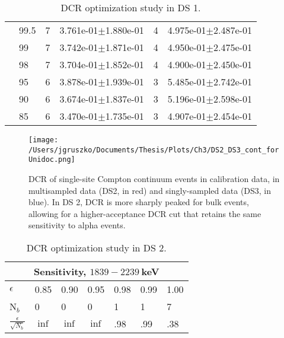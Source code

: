 \begin{table}[h]
\begin{tabular}{l l l l l l}
            &    99.5 &                      7 &            3.761e-01$\pm$1.880e-01 &                    4 &            4.975e-01$\pm$2.487e-01 \\
            &      99 &                      7 &            3.742e-01$\pm$1.871e-01 &                    4 &            4.950e-01$\pm$2.475e-01 \\
            &      98 &                      7 &            3.704e-01$\pm$1.852e-01 &                    4 &            4.900e-01$\pm$2.450e-01 \\
            &      95 &                      6 &            3.878e-01$\pm$1.939e-01 &                    3 &            5.485e-01$\pm$2.742e-01 \\
            &      90 &                      6 &            3.674e-01$\pm$1.837e-01 &                    3 &            5.196e-01$\pm$2.598e-01 \\
            &      85 &                      6 &            3.470e-01$\pm$1.735e-01 &                    3 &            4.907e-01$\pm$2.454e-01 \\


\end{tabular}
 \caption{DCR optimization study in DS 1.} 
 \label{tab:DCR_opt}
\end{table}


\begin{figure}[h]
 \centering
 \texttt{[image: /Users/jgruszko/Documents/Thesis/Plots/Ch3/DS2\_DS3\_cont\_forUnidoc.png]}
 \caption[Comparison of DCR in singly-sampled and multi-sampled MJD data sets]{DCR of single-site Compton continuum events in calibration data, in multisampled data (DS2, in red) and singly-sampled data (DS3, in blue). In DS 2, DCR is more sharply peaked for bulk events, allowing for a higher-acceptance DCR cut that retains the same sensitivity to alpha events.} 
 \label{fig:DS2_DS3_comparison}
\end{figure}

\begin{table}[h]
\centering
\begin{tabular}{l | l l l l l l}
\hline
\multicolumn{7}{c}{Sensitivity, $1839 - 2239~$keV} \\
\hline
$\epsilon$ & 0.85 & 0.90 & 0.95 & 0.98 & 0.99 & 1.00 \\
N$_{b}$ & 0 & 0 & 0 & 1 & 1 & 7\\
$\frac{\epsilon}{\sqrt{N_b}}$ & $\inf$ & $\inf$ & $\inf$ & .98 & .99 & .38\\
\end{tabular}
 \caption{DCR optimization study in DS 2.} 
 \label{tab:DCR_opt_DS2}
\end{table}

